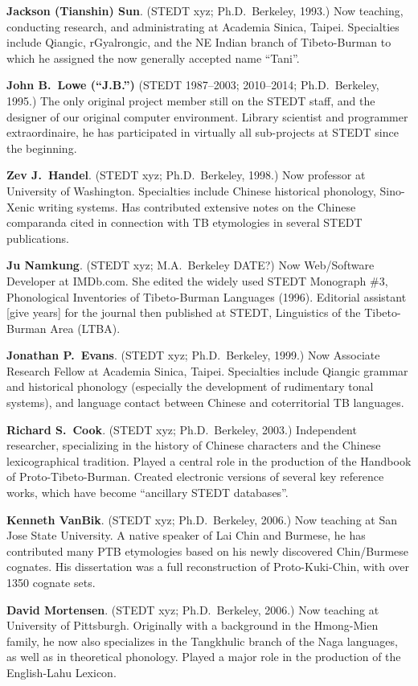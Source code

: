 \textbf{Jackson (Tianshin) Sun}. (STEDT xyz; Ph.D.\ Berkeley, 1993.) Now teaching, conducting research, and administrating at Academia Sinica, Taipei. Specialties include Qiangic, rGyalrongic, and the NE Indian branch of Tibeto-Burman to which he assigned the now generally accepted name “Tani”.

\textbf{John B.\ Lowe (“J.B.”)} (STEDT 1987–2003; 2010–2014; Ph.D.\ Berkeley, 1995.) The only original project member still on the STEDT staff, and the designer of our original computer environment. Library scientist and programmer extraordinaire, he has participated in virtually all sub-projects at STEDT since the beginning.

\textbf{Zev J.\ Handel}. (STEDT xyz; Ph.D.\ Berkeley, 1998.) Now professor at University of Washington. Specialties include Chinese historical phonology, Sino-Xenic writing systems. Has contributed extensive notes on the Chinese comparanda cited in connection with TB etymologies in several STEDT publications.

\textbf{Ju Namkung}. (STEDT xyz; M.A.\ Berkeley DATE?) Now Web/Software Developer at IMDb.com. She edited the widely used STEDT Monograph \#3, Phonological Inventories of Tibeto-Burman Languages (1996). Editorial assistant [give years] for the journal then published at STEDT, Linguistics of the Tibeto-Burman Area (LTBA).

\textbf{Jonathan P.\ Evans}. (STEDT xyz; Ph.D.\ Berkeley, 1999.) Now Associate Research Fellow at Academia Sinica, Taipei. Specialties include Qiangic grammar and historical phonology (especially the development of rudimentary tonal systems), and language contact between Chinese and coterritorial TB languages.

\textbf{Richard S.\ Cook}. (STEDT xyz; Ph.D.\ Berkeley, 2003.) Independent researcher, specializing in the history of Chinese characters and the Chinese lexicographical tradition. Played a central role in the production of the Handbook of Proto-Tibeto-Burman. Created electronic versions of several key reference works, which have become “ancillary STEDT databases”.

\textbf{Kenneth VanBik}. (STEDT xyz; Ph.D.\ Berkeley, 2006.) Now teaching at San Jose State University. A native speaker of Lai Chin and Burmese, he has contributed many PTB etymologies based on his newly discovered Chin/Burmese cognates. His dissertation was a full reconstruction of Proto-Kuki-Chin, with over 1350 cognate sets.

\textbf{David Mortensen}. (STEDT xyz; Ph.D.\ Berkeley, 2006.) Now teaching at University of Pittsburgh. Originally with a background in the Hmong-Mien family, he now also specializes in the Tangkhulic branch of the Naga languages, as well as in theoretical phonology. Played a major role in the production of the English-Lahu Lexicon.

